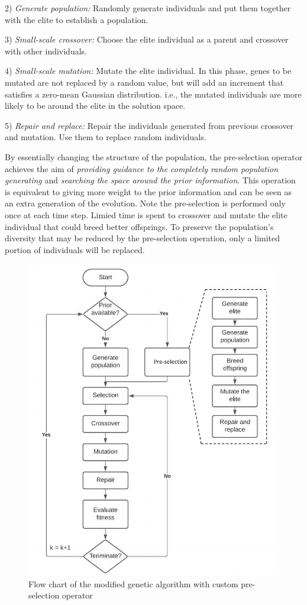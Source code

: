 \documentclass[12pt,journal,draftclsnofoot,onecolumn]{IEEEtran}
\begin{document}
2) \emph{Generate population:} Randomly generate individuals and put them together with the elite to establish a population.

3) \emph{Small-scale crossover:} Choose the elite individual as a parent and crossover with other individuals.

4) \emph{Small-scale mutation:} Mutate the elite individual. In this phase, genes to be mutated are not replaced by a random value, but will add an increment that satisfies a zero-mean Gaussian distribution. i.e., the mutated individuals are more likely to be around the elite in the solution space.

5) \emph{Repair and replace:} Repair the individuals generated from previous crossover and mutation. Use them to replace random individuals.

By essentially changing the structure of the population, the pre-selection operator achieves the aim of \emph{providing guidance to the completely random population generating} and \emph{searching the space around the prior information}. This operation is equivalent to giving more weight to the prior information and can be seen as an extra generation of the evolution. Note the pre-selection is performed only once at each time step. Limied time is spent to crossover and mutate the elite individual that could breed better offsprings. To preserve the population's diversity that may be reduced by the pre-selection operation, only a limited portion of individuals will be replaced. 

\begin{figure}
	\centering
	\includegraphics[scale=0.36]{GA.jpg}
	\caption{Flow chart of the modified genetic algorithm with custom pre-selection operator}
	\label{fig:GA}
\end{figure}
\end{document}
